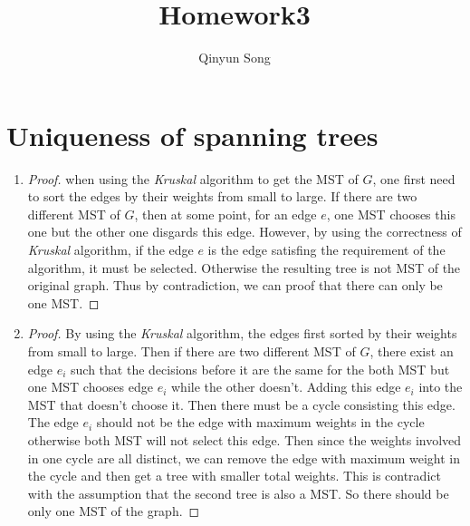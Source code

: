 \documentclass{article}
\title{Homework3}
\author{Qinyun Song}
\date{}
\begin{document}
	\maketitle

	\section{Uniqueness of spanning trees}
		\begin{enumerate}
			\item \begin{proof}
				when using the \emph{Kruskal} algorithm to get the MST of $G$, one first need to sort the edges by their weights from small to large. If there are two different MST of $G$, then at some point, for an edge $e$, one MST chooses this one but the other one disgards this edge. However, by using the correctness of \emph{Kruskal} algorithm, if the edge $e$ is the edge satisfing the requirement of the algorithm, it must be selected. Otherwise the resulting tree is not MST of the original graph. Thus by contradiction, we can proof that there can only be one MST.
			\end{proof}
			\item \begin{proof}
				By using the \emph{Kruskal} algorithm, the edges first sorted by their weights from small to large. Then if there are two different MST of $G$, there exist an edge $e_i$ such that the decisions before it are the same for the both MST but one MST chooses edge $e_i$ while the other doesn't. Adding this edge $e_i$ into the MST that doesn't choose it. Then there must be a cycle consisting this edge. The edge $e_i$ should not be the edge with maximum weights in the cycle otherwise both MST will not select this edge. Then since the weights involved in one cycle are all distinct, we can remove the edge with maximum weight in the cycle and then get a tree with smaller total weights. This is contradict with the assumption that the second tree is also a MST. So there should be only one MST of the graph.
			\end{proof}
		\end{enumerate}
\end{document}
